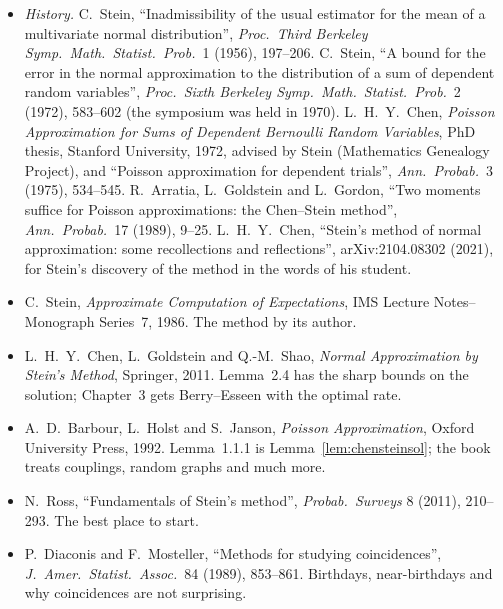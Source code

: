 \begin{itemize}
\item \emph{History.} C.~Stein, ``Inadmissibility of the usual estimator for the mean of a multivariate normal distribution'', \emph{Proc.\ Third Berkeley Symp.\ Math.\ Statist.\
Prob.}\ 1 (1956), 197--206. C.~Stein, ``A bound for the error in the normal approximation to the distribution of a sum of dependent random variables'',
\emph{Proc.\ Sixth Berkeley Symp.\ Math.\ Statist.\ Prob.}\ 2 (1972), 583--602 (the symposium was held in 1970). L.~H.~Y.~Chen, \emph{Poisson Approximation for Sums of Dependent Bernoulli
Random Variables}, PhD thesis, Stanford University, 1972, advised by Stein (Mathematics Genealogy Project), and ``Poisson approximation for dependent trials'',
\emph{Ann.\ Probab.}\ 3 (1975), 534--545. R.~Arratia, L.~Goldstein and L.~Gordon, ``Two moments suffice for Poisson approximations: the Chen--Stein method'',
\emph{Ann.\ Probab.}\ 17 (1989), 9--25. L.~H.~Y.~Chen, ``Stein's method of normal approximation: some recollections and reflections'', arXiv:2104.08302 (2021),
for Stein's discovery of the method in the words of his student.
\item C.~Stein, \emph{Approximate Computation of Expectations}, IMS Lecture Notes--Monograph Series~7, 1986. The method by its author.
\item L.~H.~Y.~Chen, L.~Goldstein and Q.-M.~Shao, \emph{Normal Approximation by Stein's Method}, Springer, 2011. Lemma~2.4 has the sharp bounds on the solution;
Chapter~3 gets Berry--Esseen with the optimal rate.
\item A.~D.~Barbour, L.~Holst and S.~Janson, \emph{Poisson Approximation}, Oxford University Press, 1992. Lemma~1.1.1 is Lemma~\ref{lem:chensteinsol}; the book treats
couplings, random graphs and much more.
\item N.~Ross, ``Fundamentals of Stein's method'', \emph{Probab.\ Surveys} 8 (2011), 210--293. The best place to start.
\item P.~Diaconis and F.~Mosteller, ``Methods for studying coincidences'', \emph{J.\ Amer.\ Statist.\ Assoc.}\ 84 (1989), 853--861. Birthdays, near-birthdays and why
coincidences are not surprising.
\end{itemize}
